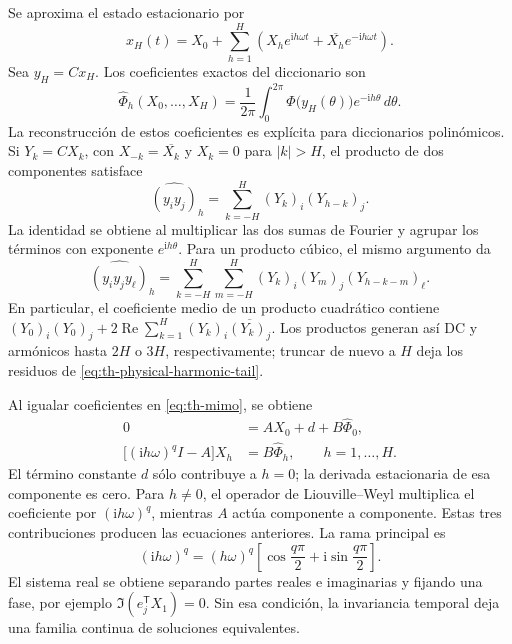 Se aproxima el estado estacionario por
\begin{equation}
 x_H(t)=X_0+
 \sum_{h=1}^{H}\left(X_he^{\mathrm i h\omega t}
 +\overline{X_h}e^{-\mathrm i h\omega t}\right).
 \label{eq:th-fourier-state}
\end{equation}
Sea \(y_H=Cx_H\). Los coeficientes exactos del diccionario son
\begin{equation}
 \widehat\Phi_h(X_0,\ldots,X_H)
 =\frac1{2\pi}\int_0^{2\pi}
 \Phi\!\bigl(y_H(\theta)\bigr)e^{-\mathrm i h\theta}\,d\theta.
 \label{eq:th-phi-fourier}
\end{equation}
La reconstrucción de estos coeficientes es explícita para diccionarios
polinómicos. Si \(Y_k=CX_k\), con \(X_{-k}=\overline{X_k}\) y
\(X_k=0\) para \(|k|>H\), el producto de dos componentes satisface
\begin{equation}
 \widehat{(y_i y_j)}_h
 =\sum_{k=-H}^{H}(Y_k)_i(Y_{h-k})_j.
 \label{eq:th-quadratic-convolution}
\end{equation}
La identidad se obtiene al multiplicar las dos sumas de Fourier y agrupar
los términos con exponente \(e^{\mathrm ih\theta}\). Para un producto
cúbico, el mismo argumento da
\begin{equation}
 \widehat{(y_i y_j y_\ell)}_h
 =\sum_{k=-H}^{H}\sum_{m=-H}^{H}
 (Y_k)_i(Y_m)_j(Y_{h-k-m})_\ell.
 \label{eq:th-cubic-convolution}
\end{equation}
En particular, el coeficiente medio de un producto cuadrático contiene
\((Y_0)_i(Y_0)_j+2\operatorname{Re}\sum_{k=1}^{H}
(Y_k)_i\overline{(Y_k)_j}\). Los productos generan así DC y armónicos
hasta \(2H\) o \(3H\), respectivamente; truncar de nuevo a \(H\) deja
los residuos de \cref{eq:th-physical-harmonic-tail}.

Al igualar coeficientes en \cref{eq:th-mimo}, se obtiene
\begin{align}
 0&=AX_0+d+B\widehat\Phi_0,
 \label{eq:th-dc-balance}\\
 \bigl[(\mathrm ih\omega)^qI-A\bigr]X_h
 &=B\widehat\Phi_h,\qquad h=1,\ldots,H.
 \label{eq:th-harmonic-balance}
\end{align}
El término constante \(d\) sólo contribuye a \(h=0\); la derivada
estacionaria de esa componente es cero. Para \(h\ne0\), el operador de
Liouville--Weyl multiplica el coeficiente por \((\mathrm ih\omega)^q\),
mientras \(A\) actúa componente a componente. Estas tres contribuciones
producen las ecuaciones anteriores. La rama principal es
\[
 (\mathrm ih\omega)^q=(h\omega)^q
 \left[\cos\frac{q\pi}{2}+\mathrm i\sin\frac{q\pi}{2}\right].
\]
El sistema real se obtiene separando partes reales e imaginarias y fijando una
fase, por ejemplo \(\Im(e_j^{\mathsf T}X_1)=0\). Sin esa condición, la
invariancia temporal deja una familia continua de soluciones equivalentes.

